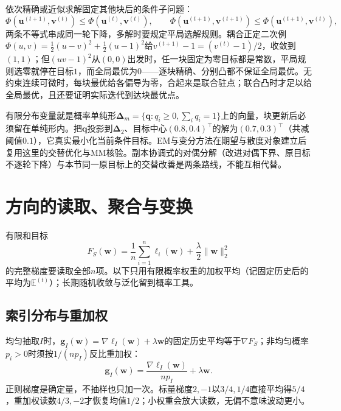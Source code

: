依次精确或近似求解固定其他块后的条件子问题：
\[
 \Phi(\bm u^{(t+1)},\bm v^{(t)})\leq\Phi(\bm u^{(t)},\bm v^{(t)}),\qquad
 \Phi(\bm u^{(t+1)},\bm v^{(t+1)})\leq\Phi(\bm u^{(t+1)},\bm v^{(t)}),
\]
两条不等式串成同一轮下降，多解时要规定平局选解规则。耦合正定二次例$\Phi(u,v)=\frac12(u-v)^2+\frac12(u-1)^2$给$v^{(t+1)}-1=(v^{(t)}-1)/2$，收敛到$(1,1)$；但$(uv-1)^2$从$(0,0)$出发时，任一块固定为零目标都是常数，平局规则选零就停在目标$1$，而全局最优为$0$——逐块精确、分别凸都不保证全局最优。无约束连续可微时，每块最优给各偏导为零，合起来是联合驻点；联合凸时才足以给全局最优，且还要证明实际迭代到达块最优点。

有限分布变量就是概率单纯形$\bm\Delta_m=\{\bm q:q_i\geq0,\sum_iq_i=1\}$上的向量，块更新后必须留在单纯形内。把$\bm q$投影到$\bm\Delta_2$、目标中心$(0.8,0.4)^\top$的解为$(0.7,0.3)^\top$（共减阈值$0.1$），它真实最小化当前条件目标。EM与变分方法在期望与散度对象建立后复用这里的交替优化与MM核验。副本协调式的对偶分解（改进对偶下界、原目标不逐轮下降）与本节同一原目标上的交替改善是两条路线，不能互相代替。

\section{方向的读取、聚合与变换}

有限和目标
\[
 F_S(\bm w)=\frac1n\sum_{i=1}^n\ell_i(\bm w)+\frac{\lambda}{2}\|\bm w\|_2^2
\]
的完整梯度要读取全部$n$项。以下只用有限概率权重的加权平均（记固定历史后的平均为$\mathbb E^{(t)}$）；长期随机收敛与泛化留到概率工具。

\subsection{索引分布与重加权}

均匀抽取$I$时，$\bm g_I(\bm w)=\nabla\ell_I(\bm w)+\lambda\bm w$的固定历史平均等于$\nabla F_S$；非均匀概率$p_i>0$时须按$1/(np_I)$反比重加权：
\[
 \bm g_I(\bm w)=\frac{\nabla\ell_I(\bm w)}{np_I}+\lambda\bm w.
\]
正则梯度是确定量，不抽样也只加一次。标量梯度$2,-1$以$3/4,1/4$直接平均得$5/4$，重加权读数$4/3,-2$才恢复均值$1/2$；小权重会放大读数，无偏不意味波动更小。

